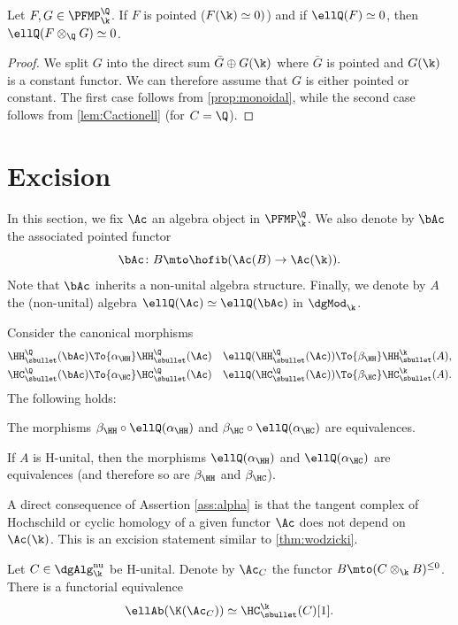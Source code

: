 \begin{cor}\label{cor:tensorellzero}
Let $F, G \in \PFMP_\k^\Q$. If $F$ is pointed (\ie $F(\k) \simeq 0)$) and if $\ellQ(F) \simeq 0$, then $\ellQ(F \otimes_\Q G) \simeq 0$.
\end{cor}
\begin{proof}
We split $G$ into the direct sum $\bar G \oplus G(\k)$ where $\bar G$ is pointed and $G(\k)$ is a constant functor. We can therefore assume that $G$ is either pointed or constant.
The first case follows from \autoref{prop:monoidal}, while the second case follows from \autoref{lem:Cactionell} (for $C = \Q$).
\end{proof}

\section{Excision}
In this section, we fix $\Ac$ an algebra object in $\PFMP_\k^\Q$.
We also denote by $\bAc$ the associated pointed functor
\[
\bAc \colon B \mto \hofib( \Ac(B) \to \Ac(\k) ).
\]
Note that $\bAc$ inherits a non-unital algebra structure.
Finally, we denote by $A$ the (non-unital) algebra $\ellQ(\Ac) \simeq \ellQ(\bAc)$ in $\dgMod_\k$.


\begin{thm}\label{thm:excision}
Consider the canonical morphisms
\begin{align*}
\HH_\sbullet^\Q(\bAc) &\To{\alpha_\HH} \HH_\sbullet^\Q(\Ac) & \ellQ(\HH_\sbullet^\Q(\Ac)) &\To{\beta_\HH} \HH_\sbullet^\k(A), \\
\HC_\sbullet^\Q(\bAc) &\To{\alpha_\HC} \HC_\sbullet^\Q(\Ac) & \ellQ(\HC_\sbullet^\Q(\Ac)) &\To{\beta_\HC}\HC_\sbullet^\k(A).
\end{align*}
The following holds:
\begin{assertions}
\item\label{ass:betagamma} The morphisms $\beta_\HH \circ \ellQ(\alpha_\HH)$ and $\beta_\HC \circ \ellQ(\alpha_\HC)$ are equivalences.
\item\label{ass:alpha} If $A$ is H-unital, then the morphisms $\ellQ(\alpha_\HH)$ and $\ellQ(\alpha_\HC)$ are equivalences (and therefore so are $\beta_\HH$ and $\beta_\HC$).
\end{assertions}
\end{thm}
\begin{rmq}
A direct consequence of Assertion \eqref{ass:alpha} is that the tangent complex of Hochschild or cyclic homology of a given functor $\Ac$ does not depend on $\Ac(\k)$. This is an excision statement similar to \autoref{thm:wodzicki}.
\end{rmq}
\begin{cor}\label{cor:tgtK}
Let $C \in \dgAlg_\k^{\mathrm{nu}}$ be H-unital. Denote by $\Ac_C$ the functor $B \mto (C \otimes_\k B)^{\leq 0}$.
There is a functorial equivalence
\[
\ellAb(\K(\Ac_C)) \simeq \HC_\sbullet^\k(C)[1].
\]
\end{cor}

